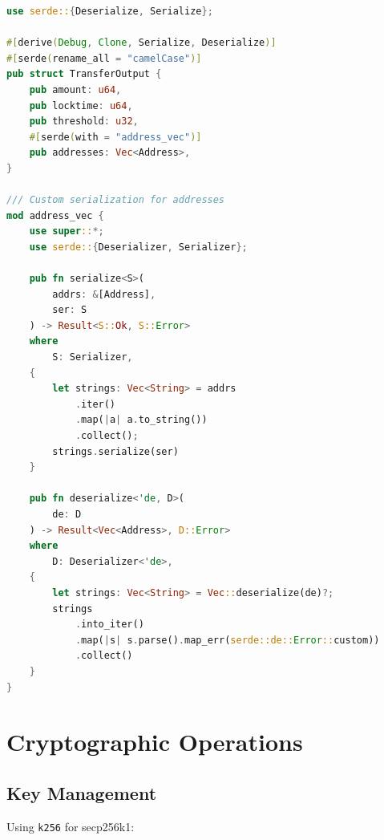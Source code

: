 \documentclass[11pt,twocolumn]{article}
\begin{document}
\begin{lstlisting}[language=Rust,caption=Serde Serialization]
use serde::{Deserialize, Serialize};

#[derive(Debug, Clone, Serialize, Deserialize)]
#[serde(rename_all = "camelCase")]
pub struct TransferOutput {
    pub amount: u64,
    pub locktime: u64,
    pub threshold: u32,
    #[serde(with = "address_vec")]
    pub addresses: Vec<Address>,
}

/// Custom serialization for addresses
mod address_vec {
    use super::*;
    use serde::{Deserializer, Serializer};

    pub fn serialize<S>(
        addrs: &[Address],
        ser: S
    ) -> Result<S::Ok, S::Error>
    where
        S: Serializer,
    {
        let strings: Vec<String> = addrs
            .iter()
            .map(|a| a.to_string())
            .collect();
        strings.serialize(ser)
    }

    pub fn deserialize<'de, D>(
        de: D
    ) -> Result<Vec<Address>, D::Error>
    where
        D: Deserializer<'de>,
    {
        let strings: Vec<String> = Vec::deserialize(de)?;
        strings
            .into_iter()
            .map(|s| s.parse().map_err(serde::de::Error::custom))
            .collect()
    }
}
\end{lstlisting}

\section{Cryptographic Operations}

\subsection{Key Management}

Using \texttt{k256} for secp256k1:
\end{document}
